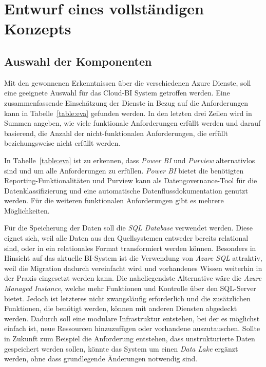 \section{Entwurf eines vollständigen Konzepts} \label{sec:entwurfBIArchitektur}

\subsection{Auswahl der Komponenten} \label{sec:konzeption:evaAuswertung}
Mit den gewonnenen Erkenntnissen über die verschiedenen Azure Dienste, soll eine geeignete Auswahl für das Cloud-BI System getroffen werden. Eine zusammenfassende Einschätzung der Dienste in Bezug auf die Anforderungen kann in Tabelle~\ref{table:eva} gefunden werden. In den letzten drei Zeilen wird in Summen angeben, wie viele funktionale Anforderungen erfüllt werden und darauf basierend, die Anzahl der nicht-funktionalen Anforderungen, die erfüllt beziehungsweise nicht erfüllt werden.


In Tabelle~\ref{table:eva} ist zu erkennen, dass \textit{Power BI} und \textit{Purview} alternativlos sind und um alle Anforderungen zu erfüllen. \textit{Power BI} bietet die benötigten Reporting-Funktionalitäten und Purview kann als Datengovernance-Tool für die Datenklassifizierung und eine automatische Datenflussdokumentation genutzt werden. Für die weiteren funktionalen Anforderungen gibt es mehrere Möglichkeiten. 

Für die Speicherung der Daten soll die \textit{SQL Database} verwendet werden. Diese eignet sich, weil alle Daten aus den Quellsystemen entweder bereits relational sind, oder in ein relationales Format transformiert werden können. Besonders in Hinsicht auf das aktuelle BI-System ist die Verwendung von \textit{Azure SQL} attraktiv, weil die Migration dadurch vereinfacht wird und vorhandenes Wissen weiterhin in der Praxis eingesetzt werden kann. Die naheliegendste Alternative wäre die \textit{Azure Managed Instance}, welche mehr Funktionen und Kontrolle über den SQL-Server bietet. Jedoch ist letzteres nicht zwangsläufig erforderlich und die zusätzlichen Funktionen, die benötigt werden, können mit anderen Diensten abgedeckt werden. Dadurch soll eine modulare Infrastruktur entstehen, bei der es möglichst einfach ist, neue Ressourcen hinzuzufügen oder vorhandene auszutauschen. Sollte in Zukunft zum Beispiel die Anforderung entstehen, dass unstrukturierte Daten gespeichert werden sollen, könnte das System um einen \textit{Data Lake} ergänzt werden, ohne dass grundlegende Änderungen notwendig sind.

